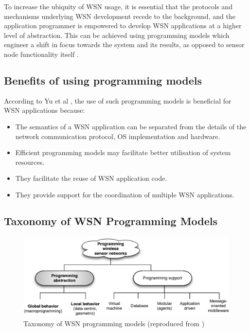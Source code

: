  To increase the ubiquity of WSN
usage, it is essential that the protocols and mechanisms underlying WSN
development recede to the background, and the application programmer is
empowered to develop WSN applications at a higher level of abstraction. This
can be achieved using programming models which engineer a shift in focus
towards the system and its results, as opposed to sensor node functionality
itself \cite{mottola_middleware:2008}. 

\subsection{Benefits of using programming models}

According to Yu et al \cite{yu_issuesMiddleware:2004}, the use of such
programming models is beneficial for WSN applications because:
\begin{itemize}
\item The semantics of a WSN application can be separated from the details of 
the network communication protocol, OS implementation and hardware.
\item Efficient programming models may facilitate better utilisation of system 
resources.
\item They facilitate the reuse of WSN application code.
\item They provide support for the coordination of multiple WSN applications.
\end{itemize}

\subsection{Taxonomy of WSN Programming Models}

\begin{figure}
\centering
\label{Fig:ProgrammingModels}
\includegraphics[scale=0.6]{img/ProgrammingAbstractions.eps} \caption[Taxonomy 
of WSN programming models]{Taxonomy of WSN programming models (reproduced from
\cite{hadim_middleware:2006})}
\end{figure}

